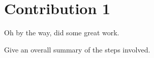 
\section{Contribution 1}
\label{sec:contribution1}


Oh by the way, \cite{kallen2012technical} did some great work.

Give an overall summary of the steps involved.